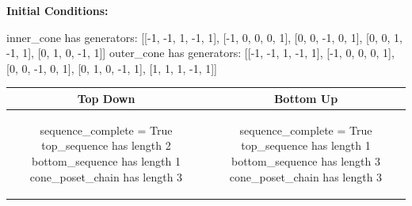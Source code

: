 \documentclass[10pt]{article}
\begin{document}
\textbf{Initial Conditions:}
\begin{SAGE}
inner_cone has generators: 
[[-1, -1, 1, -1, 1], [-1, 0, 0, 0, 1], [0, 0, -1, 0, 1], [0, 0, 1, -1, 1], [0, 1, 0, -1, 1]]
outer_cone has generators: 
[[-1, -1, 1, -1, 1], [-1, 0, 0, 0, 1], [0, 0, -1, 0, 1], [0, 1, 0, -1, 1], [1, 1, 1, -1, 1]]

\end{SAGE}
\begin{tabular}{c|c}
\textbf{Top Down} & \textbf{Bottom Up} \\ \hline  
\begin{SAGE}
sequence_complete = True
top_sequence has length 2
bottom_sequence has length 1
cone_poset_chain has length 3
\end{SAGE} 
&
\begin{SAGE}
sequence_complete = True
top_sequence has length 1
bottom_sequence has length 3
cone_poset_chain has length 3
\end{SAGE} 
\\ \hline


\end{tabular}
\end{document}
